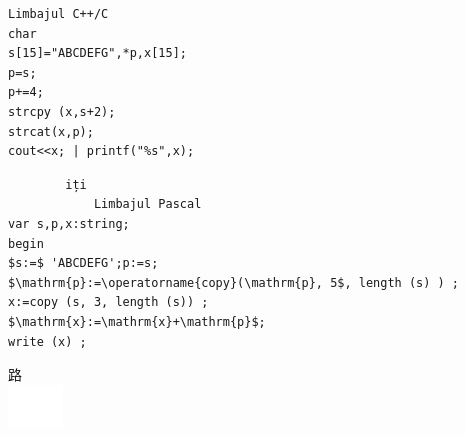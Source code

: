 \documentclass[10pt]{article}
\begin{document}
\begin{verbatim}
Limbajul C++/C
char
s[15]="ABCDEFG",*p,x[15];
p=s;
p+=4;
strcpy (x,s+2);
strcat(x,p);
cout<<x; | printf("%s",x);
\end{verbatim}

\begin{verbatim}
        iți
            Limbajul Pascal
var s,p,x:string;
begin
$s:=$ 'ABCDEFG';p:=s;
$\mathrm{p}:=\operatorname{copy}(\mathrm{p}, 5$, length (s) ) ;
x:=copy (s, 3, length (s)) ;
$\mathrm{x}:=\mathrm{x}+\mathrm{p}$;
write (x) ;
\end{verbatim}

路\\
\includegraphics[max width=\textwidth, center]{2025_04_17_46e04c6acd873ea9558dg-219}\\
\end{document}
